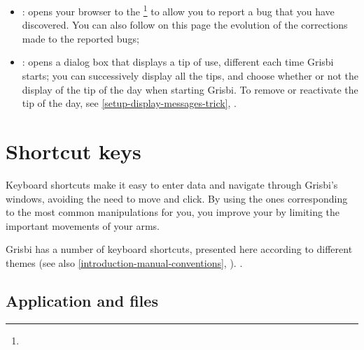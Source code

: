 \begin{itemize}
\item {}: opens your browser to the \footnote{\urlBugTracker{}} to allow you to report a bug that you have discovered. You can also follow on this page the evolution of the corrections made to the reported bugs;
\item {}: opens a dialog box that displays a tip of use, different each time Grisbi starts; you can successively display all the tips, and choose whether or not the display of the tip of the day when starting Grisbi. To remove or reactivate the tip of the day, see \vref{setup-display-messages-trick}, .
\end{itemize}

\section{Shortcut keys\label{home-shortcuts}}


Keyboard shortcuts make it easy to enter data and navigate through Grisbi's windows, avoiding the need to move and click. By using the ones corresponding to the most common manipulations for you, you improve your  by limiting the important movements of your arms.
 
Grisbi has a number of keyboard shortcuts, presented here according to different themes (see also  \vref{introduction-manual-conventions}, ).
.

\subsection{Application and files}

